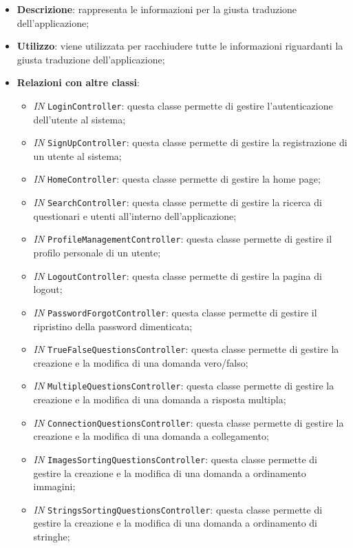 		\begin{itemize}
			\item \textbf{Descrizione}: rappresenta le informazioni per la giusta traduzione dell'applicazione;
			\item \textbf{Utilizzo}: viene utilizzata per racchiudere tutte le informazioni riguardanti la giusta traduzione dell'applicazione;
			\item \textbf{Relazioni con altre classi}: 
			\begin{itemize}
				\item \textit{IN} \texttt{LoginController}: questa classe permette di gestire l'autenticazione dell'utente al sistema; 
				\item \textit{IN} \texttt{SignUpController}: questa classe permette di gestire la registrazione di un utente al sistema;
				\item \textit{IN} \texttt{HomeController}: questa classe permette di gestire la home page;
				\item \textit{IN} \texttt{SearchController}: questa classe permette di gestire la ricerca di questionari e utenti all'interno dell'applicazione;
				\item \textit{IN} \texttt{ProfileManagementController}: questa classe permette di gestire il profilo personale di un utente;
				\item \textit{IN} \texttt{LogoutController}: questa classe permette di gestire la pagina di logout;
				\item \textit{IN} \texttt{PasswordForgotController}: questa classe permette di gestire il ripristino della password dimenticata;
				\item \textit{IN} \texttt{TrueFalseQuestionsController}: questa classe permette di gestire la creazione e la modifica di una domanda vero/falso;
				\item \textit{IN} \texttt{MultipleQuestionsController}: questa classe permette di gestire la creazione e la modifica di una domanda a risposta multipla; 
				\item \textit{IN} \texttt{ConnectionQuestionsController}: questa classe permette di gestire la creazione e la modifica di una domanda a collegamento;
				\item \textit{IN} \texttt{ImagesSortingQuestionsController}: questa classe permette di gestire la creazione e la modifica di una domanda a ordinamento immagini;
				\item \textit{IN} \texttt{StringsSortingQuestionsController}: questa classe permette di gestire la creazione e la modifica di una domanda a ordinamento di stringhe;

\end{itemize}
\end{itemize}
